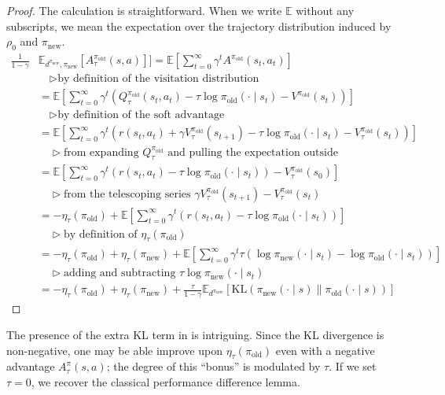 \documentclass[twoside,11pt]{article}
\newcommand{\Ex}{\mathbb{E}}
\newcommand{\KL}{\mathrm{KL}}
\newcommand{\pinew}{{\pi_\mathrm{new}}}
\newcommand{\piold}{{\pi_\mathrm{old}}}
\begin{document}
\begin{proof}
%
The calculation is straightforward. When we write $\Ex$ without any subscripts, we mean the expectation over the trajectory distribution induced by $\rho_0$ and $\pinew$.
\begin{align*}
    \frac{1}{1 - \gamma}&\Ex_{d^{\pinew},\pinew}[A^{\piold}_\tau(s, a)]] = \Ex\left[\sum_{t = 0}^\infty \gamma^t A^{\piold}(s_t, a_t)\right]\\
    &\quad \triangleright \text{by definition of the visitation distribution}\\
    &= \Ex\left[\sum_{t = 0}^\infty \gamma^t (Q^\piold_\tau(s_t, a_t) - \tau \log \piold(\cdot \mid s_t) - V^{\piold}(s_t))\right]\\
    &\quad \triangleright \text{by definition of the soft advantage}\\
        &= \Ex\left[\sum_{t = 0}^\infty \gamma^t (r(s_t, a_t) + \gamma V_\tau^{\piold}(s_{t + 1}) - \tau \log \piold(\cdot \mid s_t) - V^{\piold}_\tau(s_t))\right]\\
        &\quad \triangleright \text{from expanding } Q^\piold_\tau \text{ and pulling the expectation outside}\\
        &= \Ex\left[\sum_{t = 0}^\infty \gamma^t (r(s_t, a_t) - \tau \log \piold(\cdot \mid s_t)) - V_\tau^{\piold}(s_0)\right]\\
        &\quad \triangleright \text{from the telescoping series } \gamma V^\piold_\tau(s_{t + 1}) - V^\piold_\tau(s_t)\\
        &= -\eta_\tau(\piold) + \Ex\left[\sum_{t = 0}^\infty \gamma^t (r(s_t, a_t) - \tau \log  \piold(\cdot \mid s_t)) \right]\\
        &\quad \triangleright \text{by definition of } \eta_\tau(\piold)\\
        &= -\eta_\tau(\piold) + \eta_\tau(\pinew) + \Ex\left[\sum_{t = 0}^\infty \gamma^t \tau (\log \pinew(\cdot \mid s_t) -  \log  \piold( \cdot \mid s_t)) \right] \\
        &\quad \triangleright \text{adding and subtracting } \tau \log \pinew(\cdot \mid s_t)\\
        &= -\eta_\tau(\piold) + \eta_\tau(\pinew)  + \frac{\tau}{1 - \gamma} \Ex_{d^{\pinew}}[\KL(\pinew(\cdot \mid s) \parallel \piold(\cdot \mid s))]
\end{align*}
\end{proof}
The presence of the extra KL term in  is intriguing. Since the KL divergence is non-negative, one may be able improve upon $\eta_\tau(\piold)$ even with a negative advantage $A^\pi_\tau(s, a)$; the degree of this ``bonus'' is modulated by $\tau$. If we set $\tau = 0$, we recover the classical performance difference lemma. 
\end{document}
